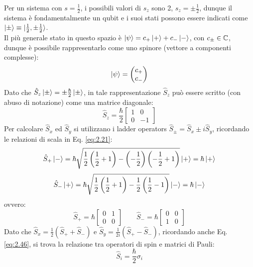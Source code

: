 Per un sistema con $ s = \frac{1}{2} $, i possibili valori di $ s_z $ sono 2, $ s_z = \pm \frac{1}{2} $, dunque il sistema è fondamentalmente un qubit e i suoi stati possono essere indicati come $ \ket{\pm} \equiv \ket{\frac{1}{2},\pm\frac{1}{2}} $.\\
Il più generale stato in questo spazio è $ \ket{\psi} = c_+ \ket{+} + c_- \ket{-} $, con $ c_{\pm}\in\mathbb{C} $, dunque è possibile rappresentarlo come uno spinore (vettore a componenti complesse):
\begin{equation}
	\ket{\psi} =
	\begin{pmatrix}
		c_+ \\ c_-
	\end{pmatrix}
	\label{eq:2.45}
\end{equation}
Dato che $ \hat{S}_z \ket{\pm} = \pm \frac{\hbar}{2} \ket{\pm} $, in tale rappresentazione $ \hat{S}_z $ può essere scritto (con abuso di notazione) come una matrice diagonale:
\begin{equation}
	\hat{S}_z = \frac{\hbar}{2}
	\begin{bmatrix}
		1 & 0 \\
		0 & -1
	\end{bmatrix}
	\label{eq:2.46}
\end{equation}
Per calcolare $ \hat{S}_x $ ed $ \hat{S}_y $ si utilizzano i ladder operators $ \hat{S}_{\pm} = \hat{S}_x \pm i \hat{S}_y $, ricordando le relazioni di scala in Eq. \ref{eq:2.21}:
\begin{equation*}
	\hat{S}_+ \ket{-} = \hbar \sqrt{\frac{1}{2} \left( \frac{1}{2} + 1 \right) - \left( - \frac{1}{2} \right) \left( - \frac{1}{2} + 1 \right)} \ket{+} = \hbar \ket{+}
\end{equation*}
\begin{equation*}
	\hat{S}_- \ket{+} = \hbar \sqrt{\frac{1}{2} \left( \frac{1}{2} + 1 \right) - \frac{1}{2} \left( \frac{1}{2} - 1 \right)} \ket{-} = \hbar \ket{-}
\end{equation*}
ovvero:
\begin{equation}
	\hat{S}_+ = \hbar
	\begin{bmatrix}
		0 & 1 \\
		0 & 0
	\end{bmatrix}
	\qquad
	\hat{S}_- = \hbar
	\begin{bmatrix}
		0 & 0 \\
		1 & 0
	\end{bmatrix}
	\label{eq:2.47}
\end{equation}
Dato che $ \hat{S}_x = \frac{1}{2} \left( \hat{S}_+ + \hat{S}_- \right) $ e $ \hat{S}_y = \frac{1}{2i} \left( \hat{S}_+ - \hat{S}_- \right) $, ricordando anche Eq. \ref{eq:2.46}, si trova la relazione tra operatori di spin e matrici di Pauli:
\begin{equation}
	\hat{S}_i = \frac{\hbar}{2} \sigma_i
	\label{eq:2.48}
\end{equation}

